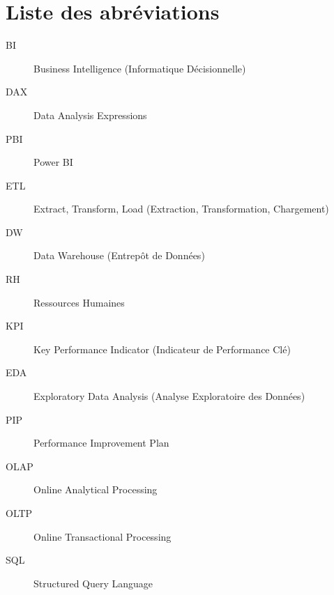 \chapter*{Liste des abréviations}

\begin{description}
    \item[BI] Business Intelligence (Informatique Décisionnelle)
    \item[DAX] Data Analysis Expressions
    \item[PBI] Power BI
    \item[ETL] Extract, Transform, Load (Extraction, Transformation, Chargement)
    \item[DW] Data Warehouse (Entrepôt de Données)
    \item[RH] Ressources Humaines
    \item[KPI] Key Performance Indicator (Indicateur de Performance Clé)
    \item[EDA] Exploratory Data Analysis (Analyse Exploratoire des Données)
    \item[PIP] Performance Improvement Plan
    \item[OLAP] Online Analytical Processing
    \item[OLTP] Online Transactional Processing
    \item[SQL] Structured Query Language
\end{description}
